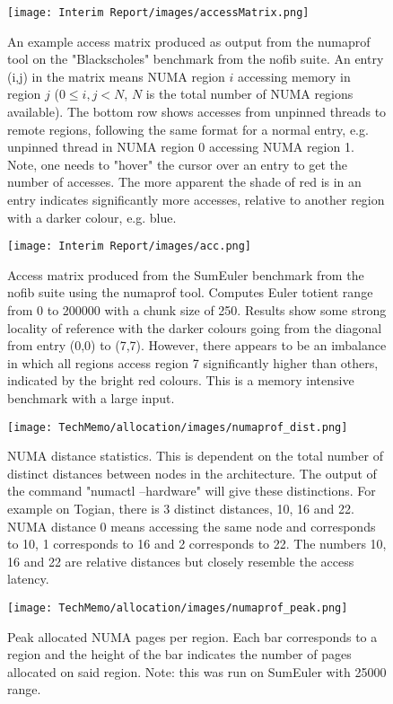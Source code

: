 \documentclass[a4paper,11pt]{article}
\begin{document}
\begin{figure}[!htb]
    \centering
    \texttt{[image: Interim Report/images/accessMatrix.png]}
    \caption{An example access matrix produced as output from the numaprof tool on the "Blackscholes" benchmark from the nofib suite. An entry (i,j) in the matrix means NUMA region $i$ accessing memory in region $j$ ($0 \leq i,j < N$, $N$ is the total number of NUMA regions available). The bottom row shows accesses from unpinned threads to remote regions, following the same format for a normal entry, e.g. unpinned thread in NUMA region 0 accessing NUMA region 1. Note, one needs to "hover" the cursor over an entry to get the number of accesses. The more apparent the shade of red is in an entry indicates significantly more accesses, relative to another region with a darker colour, e.g. blue.}
    \label{fig:access_matrix}
\end{figure}

\begin{figure}[!htb]
    \centering
    \texttt{[image: Interim Report/images/acc.png]}
    \caption{Access matrix produced from the SumEuler benchmark from the nofib suite using the numaprof tool. Computes Euler totient range from 0 to 200000 with a chunk size of 250. Results show some strong locality of reference with the darker colours going from the diagonal from entry (0,0) to (7,7). However, there appears to be an imbalance in which all regions access region 7 significantly higher than others, indicated by the bright red colours. This is a memory intensive benchmark with a large input.}
    \label{fig:access}
\end{figure}

\begin{figure}[!htb]
    \centering
    \texttt{[image: TechMemo/allocation/images/numaprof\_dist.png]}
    \caption{NUMA distance statistics. This is dependent on the total number of distinct distances between nodes in the architecture. The output of the command "numactl --hardware" will give these distinctions. For example on Togian, there is 3 distinct distances, 10, 16 and 22. NUMA distance 0 means accessing the same node and corresponds to 10, 1 corresponds to 16 and 2 corresponds to 22. The numbers 10, 16 and 22 are relative distances but closely resemble the access latency.}
    \label{fig:numa_dist}
\end{figure}

\begin{figure}[!htb]
    \centering
    \texttt{[image: TechMemo/allocation/images/numaprof\_peak.png]}
    \caption{Peak allocated NUMA pages per region. Each bar corresponds to a region and the height of the bar indicates the number of pages allocated on said region. Note: this was run on SumEuler with 25000 range.}
    \label{fig:numa_peak}
\end{figure}
\end{document}
